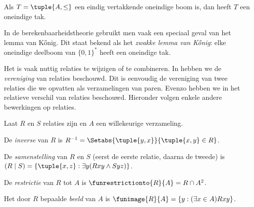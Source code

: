\documentclass[openany]{memoir}
\begin{document}
\begin{prop}
Als $T = \tuple{A,\le}$ een eindig vertakkende oneindige boom is, dan
heeft $T$ een oneindige tak.
\end{prop}

In de berekenbaarheidstheorie gebruikt men vaak een speciaal geval van
het lemma van K\H{o}nig. Dit staat bekend als het \emph{zwakke lemma van
K\H{o}nig}: elke oneindige deelboom van $\{0,1\}^*$ heeft een
oneindige tak.
\endgroup

\begingroup
\def\olfilename{OLP-0019}
\def\olfilepath{content/sets-functions-relations/relations/}
\hypertarget{unit-OLP-0019}{}




Het is vaak nuttig relaties te wijzigen of te combineren. In
 hebben we de \emph{vereniging}
van relaties beschouwd. Dit is eenvoudig de vereniging van twee relaties die
we opvatten als verzamelingen van paren. Evenzo hebben we in
 het relatieve verschil van relaties
beschouwd. Hieronder volgen enkele andere bewerkingen op relaties.

\begin{defn} 
Laat $R$ en $S$ relaties zijn en $A$ een willekeurige verzameling.

De \emph{inverse} van $R$ is $R^{-1} = \Setabs{\tuple{y, x}}{\tuple{x,
    y} \in R}$.

De \emph{samenstelling} van $R$ en $S$ (eerst de eerste relatie, daarna de
tweede) is $(R \mid S) =
\{\tuple{x, z} : \exists y(Rxy \land Syz)\}$.

De \emph{restrictie} van $R$ tot $A$ is $\funrestrictionto{R}{A}= R
\cap A^2$.

Het door $R$ bepaalde \emph{beeld} van $A$ is $\funimage{R}{A} = \{y :
(\exists x \in A)Rxy\}$.
\end{defn}
\end{document}
